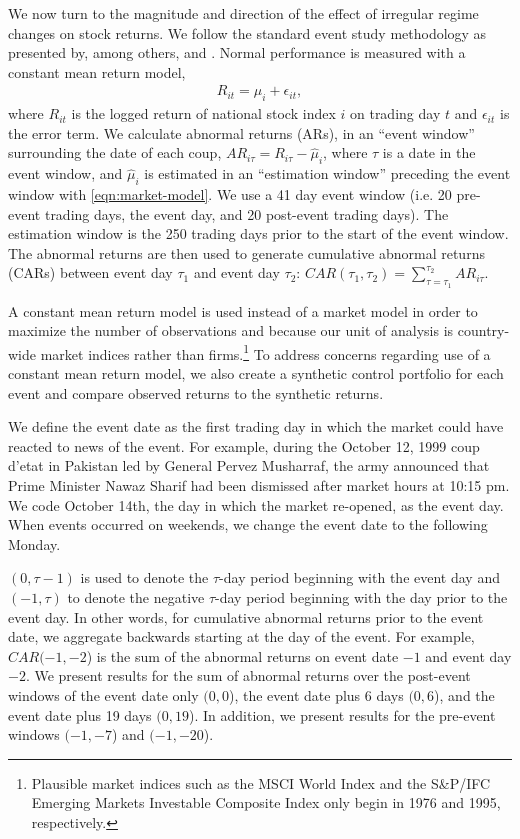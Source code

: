 \documentclass[12pt,final,fleqn]{article}
\theoremstyle{plain}
\begin{document}
We now turn to the magnitude and direction of the effect of irregular regime changes on stock returns. We follow the standard event study methodology as presented by, among others, \citet{mackinlay1997event} and \citet{campbell1997econometrics}. Normal performance is measured with a constant mean return model,
\begin{align} \label{eqn:market-model}
R_{it}=\mu_{i}+\epsilon_{it},
\end{align}
where $R_{it}$ is the logged return of national stock index $i$ on trading day $t$ and $\epsilon_{it}$ is the error term. We calculate abnormal returns (ARs), in an ``event window'' surrounding the date of each coup, $AR_{i\tau}=R_{i\tau}-\widehat{\mu}_i$, where $\tau$ is a date in the event window, and $\widehat{\mu}_i$ is estimated in an ``estimation window'' preceding the event window with \autoref{eqn:market-model}. We use a 41 day event window (i.e. 20 pre-event trading days, the event day, and 20 post-event trading days). The estimation window is the 250 trading days prior to the start of the event window. The abnormal returns are then used to generate cumulative abnormal returns (CARs) between event day $\tau_1$ and event day $\tau_2$: $CAR(\tau_1,\tau_2)=\sum_{\tau=\tau_1}^{\tau_2}AR_{i\tau}$.

A constant mean return model is used instead of a market model in order to maximize the number of observations and because our unit of analysis is country-wide market indices rather than firms.\footnote{Plausible market indices such as the MSCI World Index and the S\&P/IFC Emerging Markets Investable Composite Index only begin in 1976 and 1995, respectively.} To address concerns regarding use of a constant mean return model, we also create a synthetic control portfolio for each event and compare observed returns to the synthetic returns. 

We define the event date as the first trading day in which the market could have reacted to news of the event. For example, during the October 12, 1999 coup d'etat in Pakistan led by General Pervez Musharraf, the army announced that Prime Minister Nawaz Sharif had been dismissed after market hours at 10:15 pm. We code October 14th, the day in which the market re-opened, as the event day. When events occurred on weekends, we change the event date to the following Monday.

$(0,\tau-1)$ is used to denote the $\tau$-day period beginning with the event day and $(-1,\tau)$ to denote the negative $\tau$-day period beginning with the day prior to the event day. In other words, for cumulative abnormal returns prior to the event date, we aggregate backwards starting at the day of the event. For example, $CAR(-1,-2$) is the sum of the abnormal returns on event date $-1$ and event day $-2$. We present results for the sum of abnormal returns over the post-event windows of the event date only $(0,0$), the event date plus 6 days $(0,6$), and the event date plus 19 days $(0,19$). In addition, we present results for the pre-event windows $(-1,-7$) and $(-1,-20$).
\end{document}
